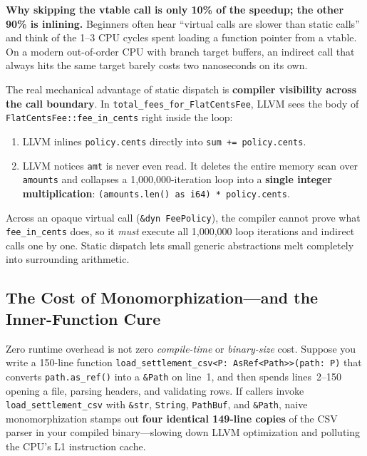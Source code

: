 \begin{happeningbox}
\textbf{Why skipping the vtable call is only 10\% of the speedup; the other 90\% is inlining.} Beginners often hear ``virtual calls are slower than static calls'' and think of the 1--3 CPU cycles spent loading a function pointer from a vtable. On a modern out-of-order CPU with branch target buffers, an indirect call that always hits the same target barely costs two nanoseconds on its own.

The real mechanical advantage of static dispatch is \textbf{compiler visibility across the call boundary}. In \texttt{total\_fees\_for\_FlatCentsFee}, LLVM sees the body of \texttt{FlatCentsFee::fee\_in\_cents} right inside the loop:
\begin{enumerate}
  \item LLVM inlines \texttt{policy.cents} directly into \texttt{sum += policy.cents}.
  \item LLVM notices \texttt{amt} is never even read. It deletes the entire memory scan over \texttt{amounts} and collapses a 1,000,000-iteration loop into a \textbf{single integer multiplication}: \texttt{(amounts.len() as i64) * policy.cents}.
\end{enumerate}
Across an opaque virtual call (\texttt{\&dyn FeePolicy}), the compiler cannot prove what \texttt{fee\_in\_cents} does, so it \emph{must} execute all 1,000,000 loop iterations and indirect calls one by one. Static dispatch lets small generic abstractions melt completely into surrounding arithmetic.
\end{happeningbox}

\subsection{The Cost of Monomorphization---and the Inner-Function Cure}

Zero runtime overhead is not zero \emph{compile-time} or \emph{binary-size} cost. Suppose you write a 150-line function \texttt{load\_settlement\_csv<P: AsRef<Path>>(path: P)} that converts \texttt{path.as\_ref()} into a \texttt{\&Path} on line~1, and then spends lines~2--150 opening a file, parsing headers, and validating rows. If callers invoke \texttt{load\_settlement\_csv} with \texttt{\&str}, \texttt{String}, \texttt{PathBuf}, and \texttt{\&Path}, naive monomorphization stamps out \textbf{four identical 149-line copies} of the CSV parser in your compiled binary---slowing down LLVM optimization and polluting the CPU's L1 instruction cache.


